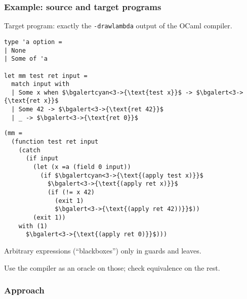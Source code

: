 \documentclass{beamer}
\begin{document}
\begin{frame}[fragile]
  \frametitle{Example: source and target programs}
  Target program: exactly the \texttt{-drawlambda} output of the OCaml compiler.

\vfill

\begin{small}
  \hspace{-1em}
  \begin{minipage}{0.36\linewidth}
\begin{lstlisting}
type 'a option =
| None
| Some of 'a

let mm test ret input =
  match input with
  | Some x when $\bgalertcyan<3->{\text{test x}}$ -> $\bgalert<3->{\text{ret x}}$
  | Some 42 -> $\bgalert<3->{\text{ret 42}}$
  | _ -> $\bgalert<3->{\text{ret 0}}$
\end{lstlisting}
  \end{minipage}
  \hfill\pause
  \begin{minipage}{0.64\linewidth}
\begin{lstlisting}
(mm =
  (function test ret input
    (catch
      (if input
        (let (x =a (field 0 input))
          (if $\bgalertcyan<3->{\text{(apply test x)}}$
            $\bgalert<3->{\text{(apply ret x)}}$
            (if (!= x 42)
              (exit 1)
              $\bgalert<3->{\text{(apply ret 42))}}$))
        (exit 1))
    with (1)
      $\bgalert<3->{\text{(apply ret 0)}}$)))
\end{lstlisting}
  \end{minipage}
\end{small}

\pause\vfill
Arbitrary expressions (``blackboxes'') only in guards and leaves.

\pause\vfill

Use the compiler as an oracle on those;
check equivalence on the rest.
\end{frame}

\begin{frame}[fragile]
\frametitle{Approach}

\vfill
\begin{center}
\end{center}
\vfill

\end{frame}
\end{document}
